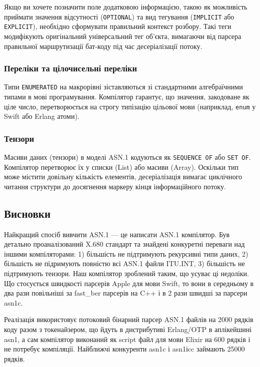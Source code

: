 Якщо ви хочете позначити поле додатковою інформацією, такою як можливість приймати значення відсутності (\texttt{OPTIONAL}) та вид тегування (\texttt{IMPLICIT} або \texttt{EXPLICIT}), необхідно сформувати правильний контекст розбору. Такі теги модифікують оригінальний універсальний тег об'єкта, вимагаючи від парсера правильної маршрутизації бат-коду під час десеріалізації потоку.

\subsubsection{Переліки та цілочисельні переліки}

Типи \texttt{ENUMERATED} на макрорівні зіставляються зі стандартними алгебраїчними типами в мові програмування. Компілятор гарантує, що значення, закодоване як ціле число, перетворюється на строгу типізацію цільової мови (наприклад, \texttt{enum} у Swift або Erlang атоми).

\subsubsection{Тензори}

Масиви даних (тензори) в моделі ASN.1 кодуються як \texttt{SEQUENCE OF} або \texttt{SET OF}. Компілятор перетворює їх у списки (List) або масиви (Array). Оскільки тип може містити довільну кількість елементів, десеріалізація вимагає циклічного читання структури до досягнення маркеру кінця інформаційного потоку.

\newpage
\subsection{Висновки}

Найкращий спосіб вивчити ASN.1 — це написати ASN.1 компілятор. Був детально проаналізований X.680 стандарт та знайдені конкуретні переваги над іншими компіляторами: 1) більшість не підтримують рекурсивні типи даних, 2) більшість не підримують повністю всі ASN.1 файли ITU.INT, 3) більшість не підтримують тензори. Наш компілятор зроблений таким, що усуває ці недоліки. Що стосується швидкості парсерів Apple для мови Swift, то вони в середньому в два рази повільніші за fast_ber парсерів на C++ і в 2 рази швидші за парсери asn1c.

Реалізація використовує потоковий бінарний парсер ASN.1 файлів на 2000 рядків коду разом з токенайзером, що йдуть в дистрибутиві Erlang/OTP в аплікейшині asn1, а сам компілятор виконаний як script файл для мови Elixir на 600 рядків і не потребує компіляції. Найближчі конкуренти asn1c і asn1іcc займають 25000 рядків.

